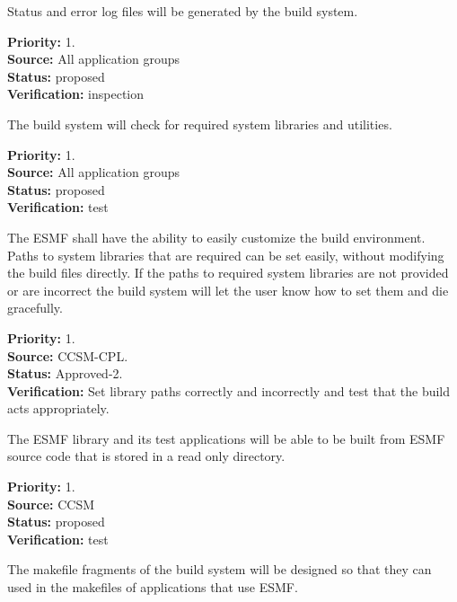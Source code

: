 Status and error log files will be generated by 
the build system.
\begin{reqlist}
{\bf Priority:} 1. \\
{\bf Source:} All application groups \\
{\bf Status:} proposed \\
{\bf Verification:} inspection
\end{reqlist}

The build system will check for required system 
libraries and utilities.
\begin{reqlist}
{\bf Priority:} 1. \\
{\bf Source:} All application groups \\
{\bf Status:} proposed \\
{\bf Verification:} test
\end{reqlist}

The ESMF shall have the ability to easily customize the build environment. 
Paths to system libraries that are required can be set easily, without 
modifying 
the build files directly. If the paths to required system libraries 
are not provided or are incorrect the build system will let the user know 
how to set them and die gracefully.
\begin{reqlist}
{\bf Priority:} 1. \\
{\bf Source:} CCSM-CPL. \\
{\bf Status:} Approved-2. \\
{\bf Verification:} Set library paths correctly and incorrectly and test that 
the build acts appropriately.
\end{reqlist}

The ESMF library and its test applications
will be able to be built from ESMF
source code that is stored in a
read only directory.

\begin{reqlist}
{\bf Priority:} 1. \\
{\bf Source:} CCSM \\
{\bf Status:} proposed \\
{\bf Verification:} test
\end{reqlist}

The makefile fragments of the build system will 
be designed so that they can used in the makefiles 
of applications that use ESMF.

